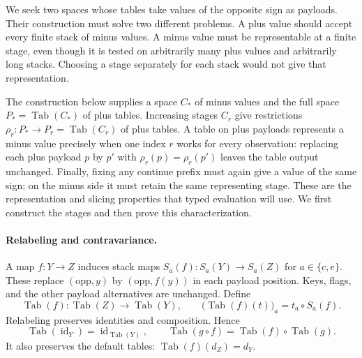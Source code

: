 We seek two spaces whose tables take values of the opposite sign as
payloads.  Their construction must solve two different problems.  A plus
value should accept every finite stack of minus values.  A minus value
must be representable at a finite stage, even though it is tested on
arbitrarily many plus values and arbitrarily long stacks.  Choosing a
stage separately for each stack would not give that representation.

The construction below supplies a space $C_*$ of minus values and the
full space $P_*=\operatorname{Tab}(C_*)$ of plus tables.  Increasing
stages $C_r$ give restrictions
$\rho_r:P_*\to P_r=\operatorname{Tab}(C_r)$ of plus tables.
A table on plus payloads represents a minus value precisely when
one index $r$ works for every observation: replacing each plus payload
$p$ by $p'$ with $\rho_r(p)=\rho_r(p')$ leaves the table output
unchanged.  Finally, fixing any continue prefix must again give a value
of the same sign; on the minus side it must retain the same representing
stage.  These are the representation and slicing properties that typed
evaluation will use.  We first construct the stages and then prove this
characterization.

\paragraph{Relabeling and contravariance.}
A map $f:Y\to Z$ induces stack maps
$S_a(f):S_a(Y)\to S_a(Z)$ for $a\in\{c,e\}$.
These replace $(\mathrm{opp},y)$ by $(\mathrm{opp},f(y))$ in each
payload position.  Keys, flags, and the other payload alternatives
are unchanged.  Define
\begin{equation}
  \operatorname{Tab}(f):\operatorname{Tab}(Z)
                  \longrightarrow\operatorname{Tab}(Y),
  \qquad
  \bigl(\operatorname{Tab}(f)(t)\bigr)_a
                   =t_a\circ S_a(f).
  \label{obs:free-contravariance}
\end{equation}
Relabeling preserves identities and composition.  Hence
\[
  \operatorname{Tab}(\operatorname{id}_Y)
     =\operatorname{id}_{\operatorname{Tab}(Y)},
  \qquad
  \operatorname{Tab}(g\circ f)
     =\operatorname{Tab}(f)\circ\operatorname{Tab}(g).
\]
It also preserves the default tables:
$\operatorname{Tab}(f)(d_Z)=d_Y$.

